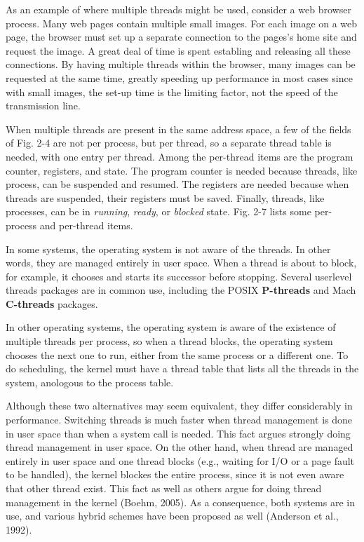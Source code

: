 \documentclass{book}
\newcommand {\kw}  [1] {\textbf{#1}}
\newcommand {\sys} [1] {\textsl{#1}}
\begin{document}
As an example of where multiple threads might be used, consider a web browser process.
Many web pages contain multiple small images.
For each image on a web page, the browser must set up a separate connection to the pages's home site and request the image.
A great deal of time is spent establing and releasing all these connections.
By having multiple threads within the browser, many images can be requested at the same time, 
greatly speeding up performance in most cases since with small images, 
the set-up time is the limiting factor, not the speed of the transmission line.

When multiple threads are present in the same address space, a few of the fields of Fig. 2-4 are not per process, but per thread,
so a separate thread table is needed, with one entry per thread.
Among the per-thread items are the program counter, registers, and state.
The program counter is needed because threads, like process, can be suspended and resumed.
The registers are needed because when threads are suspended, their registers must be saved.
Finally, threads, like processes, can be in \sys{running}, \sys{ready}, or \sys{blocked} state.
Fig. 2-7 lists some per-process and per-thread items.

In some systems, the operating system is not aware of the threads.
In other words, they are managed entirely in user space.
When a thread is about to block, for example, it chooses and starts its successor before stopping.
Several userlevel threads packages are in common use, including the POSIX \kw{P-threads} and Mach \kw{C-threads} packages.

In other operating systems, the operating system is aware of the existence of multiple threads per process,
so when a thread blocks, the operating system chooses the next one to run, either from the same process or a different one.
To do scheduling, the kernel must have a thread table that lists all the threads in the system,
anologous to the process table.

Although these two alternatives may seem equivalent, they differ considerably in performance.
Switching threads is much faster when thread management is done in user space than when a system call is needed.
This fact argues strongly doing thread management in user space.
On the other hand, when thread are managed entirely in user space and one thread blocks (e.g., waiting for I/O or a page fault to be handled),
the kernel blockes the entire process, since it is not even aware that other thread exist.
This fact as well as others argue for doing thread management in the kernel (Boehm, 2005).
As a consequence, both systems are in use, and various hybrid schemes have been proposed as well (Anderson et al., 1992).
\end{document}
